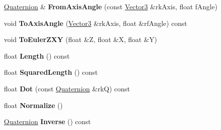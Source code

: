 \begin{DoxyCompactItemize}
\item 
\hyperlink{class_i_dream_sky_1_1_quaternion}{Quaternion} \& {\bfseries From\+Axis\+Angle} (const \hyperlink{class_i_dream_sky_1_1_vector3}{Vector3} \&rk\+Axis, float f\+Angle)\hypertarget{class_i_dream_sky_1_1_quaternion_acc340a4359729eb309871aa231553432}{}\label{class_i_dream_sky_1_1_quaternion_acc340a4359729eb309871aa231553432}

\item 
void {\bfseries To\+Axis\+Angle} (\hyperlink{class_i_dream_sky_1_1_vector3}{Vector3} \&rk\+Axis, float \&rf\+Angle) const \hypertarget{class_i_dream_sky_1_1_quaternion_ad298671cde6cba26d189a52b03d8e889}{}\label{class_i_dream_sky_1_1_quaternion_ad298671cde6cba26d189a52b03d8e889}

\item 
void {\bfseries To\+Euler\+Z\+XY} (float \&Z, float \&X, float \&Y)\hypertarget{class_i_dream_sky_1_1_quaternion_a39b02fcbbda6217f949225744f3478c1}{}\label{class_i_dream_sky_1_1_quaternion_a39b02fcbbda6217f949225744f3478c1}

\item 
float {\bfseries Length} () const \hypertarget{class_i_dream_sky_1_1_quaternion_a1813231cae9157f0582af23e792b29d8}{}\label{class_i_dream_sky_1_1_quaternion_a1813231cae9157f0582af23e792b29d8}

\item 
float {\bfseries Squared\+Length} () const \hypertarget{class_i_dream_sky_1_1_quaternion_aae4bdb70f65c6539db92fd41445accbe}{}\label{class_i_dream_sky_1_1_quaternion_aae4bdb70f65c6539db92fd41445accbe}

\item 
float {\bfseries Dot} (const \hyperlink{class_i_dream_sky_1_1_quaternion}{Quaternion} \&rkQ) const \hypertarget{class_i_dream_sky_1_1_quaternion_a535ad7eb2083b43e97686380b4729e7a}{}\label{class_i_dream_sky_1_1_quaternion_a535ad7eb2083b43e97686380b4729e7a}

\item 
float {\bfseries Normalize} ()\hypertarget{class_i_dream_sky_1_1_quaternion_a4be00f9c6368fe2b93812f62f4f05d22}{}\label{class_i_dream_sky_1_1_quaternion_a4be00f9c6368fe2b93812f62f4f05d22}

\item 
\hyperlink{class_i_dream_sky_1_1_quaternion}{Quaternion} {\bfseries Inverse} () const \hypertarget{class_i_dream_sky_1_1_quaternion_a105f2e8fd9a4acbeb094534b89133af6}{}\label{class_i_dream_sky_1_1_quaternion_a105f2e8fd9a4acbeb094534b89133af6}


\end{DoxyCompactItemize}
